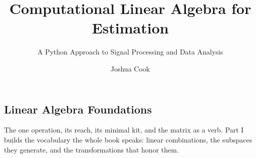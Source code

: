 \documentclass[graybox,envcountchap,envcountsame,sectrefs]{SNmono}
\begin{document}
\author{Joshua Cook}
\title{Computational Linear Algebra for Estimation}
\subtitle{A Python Approach to Signal Processing and Data Analysis}
\maketitle

\frontmatter

\preface


\tableofcontents

\mainmatter

\begin{partbacktext}
\part{Linear Algebra Foundations}
\noindent The one operation, its reach, its minimal kit, and the matrix as a
verb. Part I builds the vocabulary the whole book speaks: linear combinations,
the subspaces they generate, and the transformations that honor them.
\end{partbacktext}




\backmatter
\end{document}
